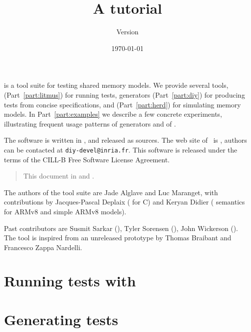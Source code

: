 \documentclass{article}
\title{A \diy{} tutorial}
\author{Version \version}
\date{\today}
\begin{document}
\maketitle

\diy{} is a tool suite for testing shared memory models.  We
provide several tools, \litmus{} (Part~\ref{part:litmus}) for running tests,
\diy{} generators (Part~\ref{part:diy}) for producing tests from concise
specifications, and
\herd{} (Part~\ref{part:herd}) for simulating memory models.
In Part~\ref{part:examples} we describe
a few concrete experiments, illustrating frequent usage patterns of
\diy{} generators and of \litmus.


The software is written in
, and released as
sources.  The web site of~\diy{} is
, authors can be contacted at
\texttt{diy-devel@inria.fr}.
This software is released under the terms of the CILL-B Free Software License
Agreement.



\begin{htmlonly}
\begin{quote}
This document in  and .
\end{quote}
\end{htmlonly}

The authors of the \diy{} tool suite are Jade Alglave and Luc Maranget,
with contributions by Jacques-Pascal Deplaix (\litmus{} for C) and
Keryan Didier (\herd{} semantics for ARMv8 and simple ARMv8 models).

Past contributors are Susmit Sarkar (\litmus),
Tyler Sorensen (\herd), John Wickerson (\herd).
The tool \litmus{} is inspired from an unreleased prototype by
Thomas Braibant and Francesco Zappa Nardelli.

\tableofcontents
\cutend

\clearpage
\part{Running\label{part:litmus} tests with \litmus}


\clearpage
\part{Generating\label{part:diy} tests}

\end{document}
